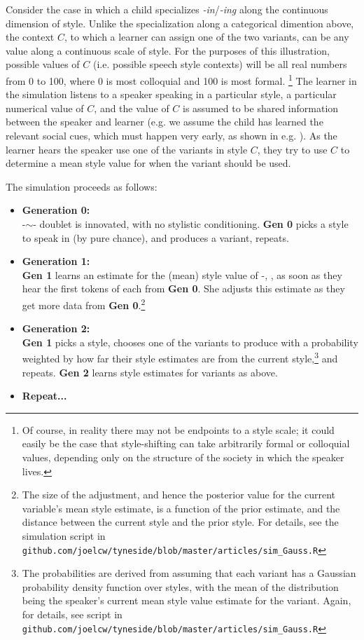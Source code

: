 Consider the case in which a child specializes \textsl{-in}/\textsl{-ing} along the continuous dimension of style.
Unlike the specialization along a categorical dimention above, the context $C$, to which a learner can assign one of the two variants, can be any value along a continuous scale of style.
For the purposes of this illustration, possible values of $C$ (i.e. possible speech style contexts) will be all real numbers from 0 to 100, where 0 is most colloquial and 100 is most formal.
\footnote{Of course, in reality there may not be endpoints to a style scale; it could easily be the case that style-shifting can take arbitrarily formal or colloquial values, depending only on the structure of the society in which the speaker lives.}
The learner in the simulation listens to a speaker speaking in a particular style, a particular numerical value of $C$, and the value of $C$ is assumed to be shared information between the speaker and learner (e.g. we assume the child has learned the relevant social cues, which must happen very early, as shown in e.g. \citealt{smithetal2007}).
As the learner hears the speaker use one of the variants in style $C$, they try to use $C$ to determine a mean style value for when the variant should be used.

The simulation proceeds as follows:

\begin{itemize}
		\item[ ]\textbf{Generation 0:}\\  -$\sim$- doublet is innovated, with no stylistic conditioning. \textbf{Gen 0} picks a style to speak in (by pure chance), and produces a variant, repeats. 
		\item[ ]\textbf{Generation 1:}\\  \textbf{Gen 1} learns an estimate for the (mean) style value of -, , as soon as they hear the first tokens of each from \textbf{Gen 0}. She adjusts this estimate as they get more data from \textbf{Gen 0}.\footnote{The size of the adjustment, and hence the posterior value for the current variable's mean style estimate, is a function of the prior estimate, and the distance between the current style and the prior style. For details, see the simulation script in \texttt{github.com/joelcw/tyneside/blob/master/articles/sim\_Gauss.R}}
		\item[ ]\textbf{Generation 2:}\\ \textbf{Gen 1} picks a style, chooses one of the variants to produce with a probability weighted by how far their style estimates are from the current style,\footnote{The probabilities are derived from assuming that each variant has a Gaussian probability density function over styles, with the mean of the distribution being the speaker's current mean style value estimate for the variant. Again, for details, see script in \texttt{github.com/joelcw/tyneside/blob/master/articles/sim\_Gauss.R}} and repeats. \textbf{Gen 2} learns style estimates for variants as above.
		\item[ ]\textbf{Repeat...}
\end{itemize}

